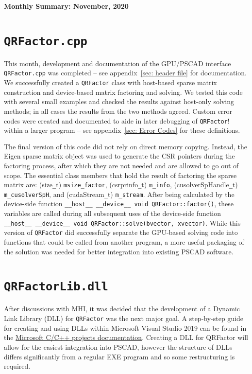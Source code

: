 \documentclass[11pt,letterpaper]{article}
\newcommand{\qrf}{\texttt{QRFactor}}
\begin{document}
\begin{center}
    {\Large \bf Monthly Summary: November, 2020}
\end{center}

\section*{\texttt{QRFactor.cpp}}

This month, development and documentation of the GPU/PSCAD interface \verb+QRFactor.cpp+ was completed -- see appendix~\ref{sec: header file} for documentation. We successfully created a \qrf\! class with host-based sparse matrix construction and device-based matrix factoring and solving. We tested this code with several small examples and checked the results against host-only solving methods; in all cases the results from the two methods agreed. Custom error codes were created and documented to aide in later debugging of \qrf! within a larger program -- see appendix~\ref{sec: Error Codes} for these definitions.

The final version of this code did not rely on direct memory copying. Instead, the Eigen sparse matrix object was used to generate the CSR pointers during the factoring process, after which they are not needed and are allowed to go out of scope. The essential class members that hold the result of factoring the sparse matrix are: (size\verb+_+t) \verb+msize_factor+, (csrprinfo\verb+_+t) \verb+m_info+, (cusolverSpHandle\verb+_+t) \verb+m_cusolverSpH+, and (cudaStream\verb+_+t) \verb+m_stream+. After being calculated by the device-side function \verb+__host__ __device__ void QRFactor::factor()+, these variables are called during all subsequent uses of the device-side function \verb+__host__ __device__ void QRFactor::solve(bvector, xvector)+. While this version of \qrf\! did successfully separate the GPU-based solving code into functions that could be called from another program, a more useful packaging of the solution was needed for better integration into existing PSCAD software.

\section*{\texttt{QRFactorLib.dll}}

After discussions with MHI, it was decided that the development of a Dynamic Link Library (DLL) for \qrf\! was the next major goal. A step-by-step guide for creating and using DLLs within Microsoft Visual Studio 2019 can be found in the \href{https://docs.microsoft.com/en-us/cpp/build/walkthrough-creating-and-using-a-dynamic-link-library-cpp?view=msvc-160#see-also}{Microsoft C/C++ projects documentation}. Creating a DLL for QRFactor will allow for the easiest integration into PSCAD, however the structure of DLLs differs significantly from a regular EXE program and so some restructuring is required. 
\end{document}
